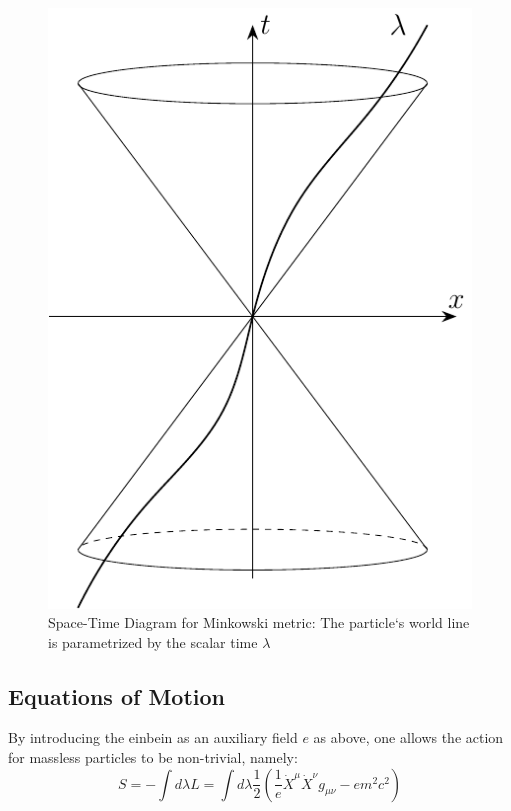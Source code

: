 \documentclass[twoside,a4paper,11pt]{article}
\numberwithin{equation}{section}
\begin{document}
\begin{figure}[H]
\begin{minipage}[H]{0.59\textwidth}
  \end{minipage}
  \hfill
  \begin{minipage}[H]{0.39\textwidth}
    \centering
    \includegraphics[width=1.0\textwidth]{Pics/Space_Time_Diagrams.pdf}
    \caption{Space-Time Diagram for Minkowski metric: The particle`s world line is parametrized by the scalar time $\lambda$}
    \label{pic:LightCone}
\end{minipage}
\end{figure}

\subsection{Equations of Motion}
By introducing the einbein as an auxiliary field $e$ as above, one allows the action for massless particles to be non-trivial, namely:
\begin{equation}
    S = -\int d\lambda L = \int d\lambda \frac{1}{2} \left(\frac{1}{e} \dot{X}^{\mu}\dot{X}^{\nu}g_{\mu \nu} - e m^2c^2 \right)
    \label{action}
\end{equation}
\end{document}

